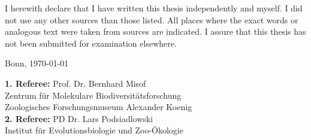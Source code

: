 \thispagestyle{empty}

I herewith declare that I have written this thesis independently and myself. I
did not use any other sources than those listed. All places where the exact
words or analogous text were taken from sources are indicated. I assure that
this thesis has not been submitted for examination elsewhere.

\vspace{4em}

\parbox[t]{0.3\textwidth}{\dotfill}

Bonn, \today

\myself

\vfill

\noindent
\textbf{1. Referee:} Prof. Dr. Bernhard Misof\\
Zentrum für Molekulare Biodiversitätsforschung\\
Zoologisches Forschungsmuseum Alexander Koenig\\

\noindent
\textbf{2. Referee:} PD Dr. Lars Podsiadlowski\\
Institut für Evolutionsbiologie und Zoo-Ökologie


